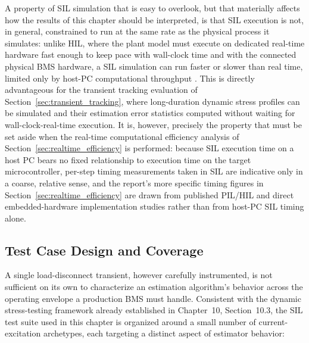 A property of SIL simulation that is easy to overlook, but that materially affects how the results of this chapter should be interpreted, is that SIL execution is not, in general, constrained to run at the same rate as the physical process it simulates: unlike HIL, where the plant model must execute on dedicated real-time hardware fast enough to keep pace with wall-clock time and with the connected physical BMS hardware, a SIL simulation can run faster or slower than real time, limited only by host-PC computational throughput \cite{opalrt_sil}. This is directly advantageous for the transient tracking evaluation of Section~\ref{sec:transient_tracking}, where long-duration dynamic stress profiles can be simulated and their estimation error statistics computed without waiting for wall-clock-real-time execution. It is, however, precisely the property that must be set aside when the real-time computational efficiency analysis of Section~\ref{sec:realtime_efficiency} is performed: because SIL execution time on a host PC bears no fixed relationship to execution time on the target microcontroller, per-step timing measurements taken in SIL are indicative only in a coarse, relative sense, and the report's more specific timing figures in Section~\ref{sec:realtime_efficiency} are drawn from published PIL/HIL and direct embedded-hardware implementation studies rather than from host-PC SIL timing alone.

\subsection{Test Case Design and Coverage}
\label{ssec:sil_test_design}

A single load-disconnect transient, however carefully instrumented, is not sufficient on its own to characterize an estimation algorithm's behavior across the operating envelope a production BMS must handle. Consistent with the dynamic stress-testing framework already established in Chapter~10, Section~10.3, the SIL test suite used in this chapter is organized around a small number of current-excitation archetypes, each targeting a distinct aspect of estimator behavior:

